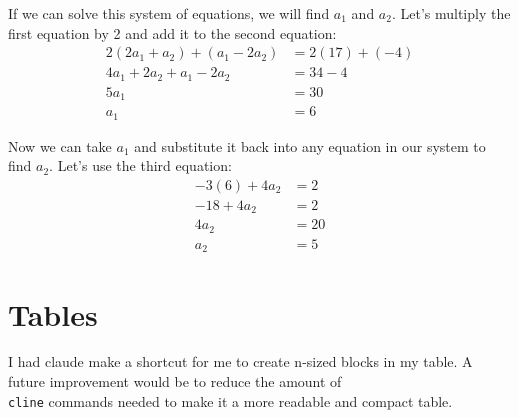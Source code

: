 \documentclass{article} %
\begin{document}
If we can solve this system of equations, we will find $a_1$ and $a_2$. Let's 
multiply the first equation by 2 and add it to the second equation:
\begin{align*}
2\left(2a_1 + a_2\right) + \left(a_1 - 2a_2\right) &= 2(17) + (-4) \\
4a_1 + 2a_2 + a_1 - 2a_2 &= 34 - 4 \\
5a_1 &= 30 \\
a_1 &= 6
\end{align*}

Now we can take $a_1$ and substitute it back into any equation in our system 
to find $a_2$. Let's use the third equation:
\begin{align*}
-3(6) + 4a_2 &= 2 \\
-18 + 4a_2 &= 2 \\
4a_2 &= 20 \\
a_2 &= 5
\end{align*}



\section{Tables}

I had claude make a shortcut for me to create n-sized blocks in my table. A future improvement would be to reduce the amount of \texttt{\\cline} commands needed to make it a more readable and compact table.

\newcommand{\block}[2]{\multirow{#1}{*}{\shortstack{#2}}}
\end{document}
